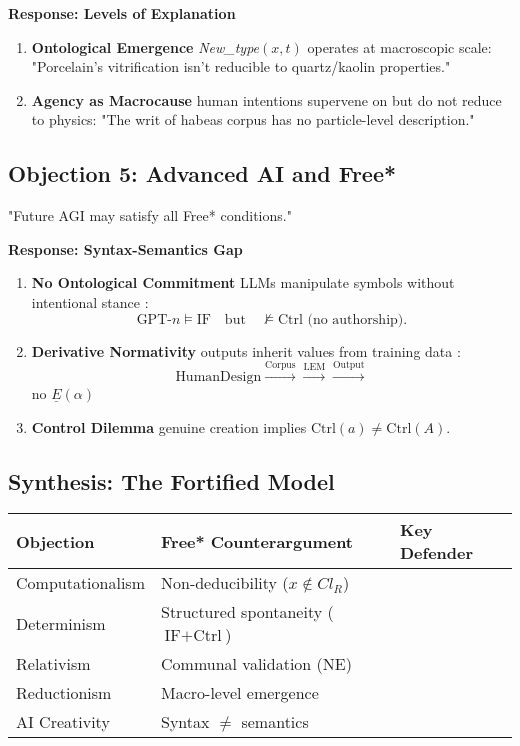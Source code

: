 \documentclass[11pt,a4paper]{article}
\begin{document}
\textbf{Response: Levels of Explanation}

\begin{enumerate}
  \item \textbf{Ontological Emergence} \emph{New_type\((x,t)\)} operates at macroscopic scale: "Porcelain's vitrification isn't reducible to quartz/kaolin properties." \cite[ p. 89]{kerr2024}
  \item \textbf{Agency as Macrocause} human intentions supervene on but do not reduce to physics: "The writ of habeas corpus has no particle-level description." \cite[ p. 133]{list2023}
\end{enumerate}

\subsection{Objection 5: Advanced AI and Free*}\label{sec:boundary-ai}

"Future AGI may satisfy all Free* conditions." \cite{bostrom2024}

\textbf{Response: Syntax-Semantics Gap}

\begin{enumerate}
  \item \textbf{No Ontological Commitment} LLMs manipulate symbols without intentional stance \cite{floridi2024}: \[\text{GPT-}n\models\text{IF}\quad\text{but}\quad\not\models\text{Ctrl (no authorship)}.\]
  \item \textbf{Derivative Normativity} outputs inherit values from training data \cite{coeckelbergh2023}: \[\text{HumanDesign}\xrightarrow{\text{Corpus}}\xrightarrow{\text{LEM}} \xrightarrow{\text{Output}}\] no \(\underline{E}(\alpha)\)
  \item \textbf{Control Dilemma} genuine creation implies \(\text{Ctrl}(a)\neq\text{Ctrl}(A)\).
\end{enumerate}

\subsection{Synthesis: The Fortified Model}\label{sec:boundary-synthesis}

\begin{tabular}{l l l}
\textbf{Objection} & \textbf{Free* Counterargument} & \textbf{Key Defender} \\
\hline
Computationalism & Non-deducibility (\(x\notin Cl_{R}\)) & \cite{malafouris2023} \\
Determinism & Structured spontaneity (\(\text{IF}+\text{Ctrl}\)) & \cite{kant2000} \\
Relativism & Communal validation (\(\text{NE}\)) & \cite{epstein2021} \\
Reductionism & Macro-level emergence & \cite{list2023} \\
AI Creativity & Syntax \(\neq\) semantics & \cite{floridi2024} \\
\end{tabular}
\end{document}
